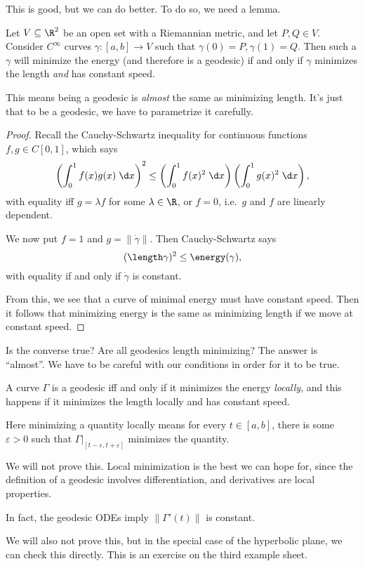 \documentclass[a4paper]{article}
\begin{document}
This is good, but we can do better. To do so, we need a lemma.

\begin{lemma}
  Let $V \subseteq \R^2$ be an open set with a Riemannian metric, and let $P, Q \in V$. Consider $C^\infty$ curves $\gamma: [a, b] \to V$ such that $\gamma(0) = P, \gamma(1) = Q$. Then such a $\gamma$ will minimize the energy (and therefore is a geodesic) if and only if $\gamma$ minimizes the length \emph{and} has constant speed.
\end{lemma}
This means being a geodesic is \emph{almost} the same as minimizing length. It's just that to be a geodesic, we have to parametrize it carefully.

\begin{proof}
  Recall the Cauchy-Schwartz inequality for continuous functions $f, g \in C[0,1]$, which says
  \[
    \left(\int_0^1 f(x)g(x)\;\d x\right)^2 \leq \left(\int_0^1 f(x)^2\;\d x\right)\left(\int_0^1 g(x)^2\;\d x\right),
  \]
  with equality iff $g = \lambda f$ for some $\lambda \in \R$, or $f = 0$, i.e.\ $g$ and $f$ are linearly dependent.

  We now put $f = 1$ and $g = \|\dot{\gamma}\|$. Then Cauchy-Schwartz says
  \[
    (\length \gamma)^2 \leq \energy(\gamma),
  \]
  with equality if and only if $\dot{\gamma}$ is constant.

  From this, we see that a curve of minimal energy must have constant speed. Then it follows that minimizing energy is the same as minimizing length if we move at constant speed.
\end{proof}

Is the converse true? Are all geodesics length minimizing? The answer is ``almost''. We have to be careful with our conditions in order for it to be true.
\begin{prop}
  A curve $\Gamma$ is a geodesic iff and only if it minimizes the energy \emph{locally}, and this happens if it minimizes the length locally and has constant speed.

  Here minimizing a quantity locally means for every $t \in [a, b]$, there is some $\varepsilon > 0$ such that $\Gamma|_{[t - \varepsilon, t + \varepsilon]}$ minimizes the quantity.
\end{prop}
We will not prove this. Local minimization is the best we can hope for, since the definition of a geodesic involves differentiation, and derivatives are local properties.

\begin{prop}
  In fact, the geodesic ODEs imply $\|\Gamma'(t)\|$ is constant.
\end{prop}
We will also not prove this, but in the special case of the hyperbolic plane, we can check this directly. This is an exercise on the third example sheet.
\end{document}
